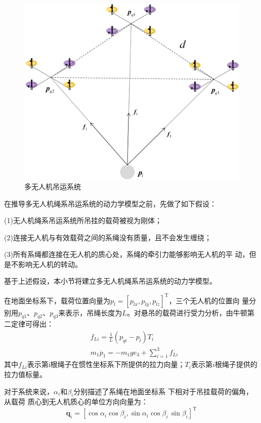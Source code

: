\documentclass[lang=chs, degree=master, blindreview=false, winfonts=true]{yanputhesis}
\begin{document}
\begin{figure}[hbt!]
	\centering
	\includegraphics[width=28pc]{picture/2_3.png} 
	\caption{多无人机吊运系统} \label{2_3}
\end{figure}

在推导多无人机绳系吊运系统的动力学模型之前，先做了如下假设：



(1)无人机绳系吊运系统所吊挂的载荷被视为刚体； 


(2)连接无人机与有效载荷之间的系绳没有质量，且不会发生缠绕；

(3)所有系绳都连接在无人机的质心处，系绳的牵引力能够影响无人机的平
动，但是不影响无人机的转动。 

基于上述假设，本小节将建立多无人机绳系吊运系统的动力学模型。


在地面坐标系下，载荷位置向量为$p_{l}=[p_{lx},p_{ly},p_{lz}]^{\mathrm{T}}$，三个无人机的位置向
量分别用$p_{q1}$、$p_{q2}$、$p_{q3}$来表示，吊绳长度为$L$。对悬吊的载荷进行受力分析，由牛顿第二定律可得出：
\begin{equation}
	\begin{aligned}
		&f_{Li}=\frac{1}{L}(p_{qi}-p_{l})T_{i} \\
		&m_{1}\ddot{p}_{1}=-m_{1}ge_{3}+\sum_{i=1}^{3}f_{Li}
	\end{aligned}
\end{equation}
其中$f_{Li}$表示第i根绳子在惯性坐标系下所提供的拉力向量；$T_{i}$表示第$i$根绳子提供的拉力值标量。

对于系统来说，$\alpha_{i}$和$\beta_i$分别描述了系绳在地面坐标系 下相对于吊挂载荷的偏角，从载荷
质心到无人机质心的单位方向向量为：
\begin{equation}
	\boldsymbol{q}_i=\left[\cos\alpha_i\cos\beta_i,\sin\alpha_i\cos\beta_i\,\sin\beta_i\right]^\mathrm T
\end{equation}
\end{document}
